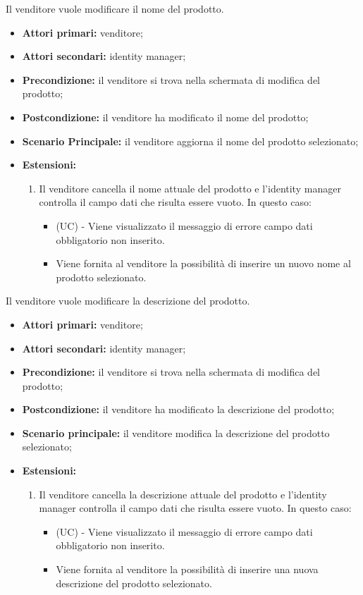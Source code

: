 \resetSubUC
{}
Il venditore vuole modificare il nome del prodotto.
\begin{itemize}
    \item \textbf{Attori primari:} venditore;
    \item \textbf{Attori secondari:} identity manager;
    \item \textbf{Precondizione:} il venditore si trova nella schermata di modifica del prodotto;
    \item \textbf{Postcondizione:} il venditore ha modificato il nome del prodotto;
    \item \textbf{Scenario Principale:} il venditore aggiorna il nome del prodotto selezionato;
    \item \textbf{Estensioni:}
    \begin{enumerate}[label=\lett]
    	\item Il venditore cancella il nome attuale del prodotto e l'identity manager controlla il campo dati che risulta essere vuoto. In questo caso:
    	\begin{itemize}
    		\item (UC) - Viene visualizzato il messaggio di errore campo dati obbligatorio non inserito.
    		\item Viene fornita al venditore la possibilità di inserire un nuovo nome al prodotto selezionato.
    	\end{itemize}
    \end{enumerate}
\end{itemize}

Il venditore vuole modificare la descrizione del prodotto.
\begin{itemize}
    \item \textbf{Attori primari:} venditore;
    \item \textbf{Attori secondari:} identity manager;
    \item \textbf{Precondizione:} il venditore si trova nella schermata di modifica del prodotto;
    \item \textbf{Postcondizione:} il venditore ha modificato la descrizione del prodotto;
    \item \textbf{Scenario principale:} il venditore modifica la descrizione del prodotto selezionato;
    \item \textbf{Estensioni:}
    \begin{enumerate}[label=\lett]
    	\item Il venditore cancella la descrizione attuale del prodotto e l'identity manager controlla il campo dati che risulta essere vuoto. In questo caso:
    	\begin{itemize}
    		\item (UC) - Viene visualizzato il messaggio di errore campo dati obbligatorio non inserito.
    		\item Viene fornita al venditore la possibilità di inserire una nuova descrizione del prodotto selezionato.
    	\end{itemize}
    \end{enumerate}
\end{itemize}

